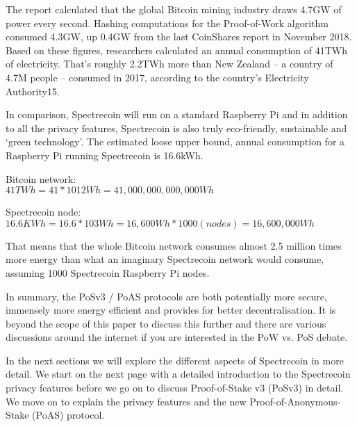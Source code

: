 The report calculated that the global Bitcoin mining industry draws 4.7GW of
power every second. Hashing computations for the Proof-of-Work algorithm
consumed 4.3GW, up 0.4GW from the last CoinShares report in November 2018.
Based on these figures, researchers calculated an annual consumption of
41TWh of electricity. That’s roughly 2.2TWh more than New Zealand – a country
of 4.7M people – consumed in 2017, according to the country’s Electricity
Authority15.



In comparison, Spectrecoin will run on a standard Raspberry Pi and in addition
to all the privacy features, Spectrecoin is also truly eco-friendly, sustainable
and ‘green technology’. The estimated loose upper bound, annual consumption for
a Raspberry Pi running Spectrecoin is 16.6kWh.

\vspace{5mm} %

Bitcoin network:\\
$41 TWh = 41*1012 Wh = 41,000,000,000,000 Wh$

\vspace{5mm} %

Spectrecoin node:\\
$16.6 KWh = 16.6 * 103 Wh = 16,600 Wh * 1000 (nodes) = 16,600,000 Wh$

\vspace{5mm} %

That means that the whole Bitcoin network consumes almost 2.5 million times
more energy than what an imaginary Spectrecoin network would consume, assuming
1000 Spectrecoin Raspberry Pi nodes.




In summary, the PoSv3 / PoAS protocols are both potentially more secure,
immensely more energy efficient and provides for better decentralisation.
It is beyond the scope of this paper to discuss this further and there are
various discussions around the internet if you are interested in the PoW vs.
PoS debate.



In the next sections we will explore the different aspects of Spectrecoin in
more detail. We start on the next page with a detailed introduction to the
Spectrecoin privacy features before we go on to discuss Proof-of-Stake v3
(PoSv3) in detail. We move on to explain the privacy features and the new
Proof-of-Anonymous-Stake (PoAS) protocol.